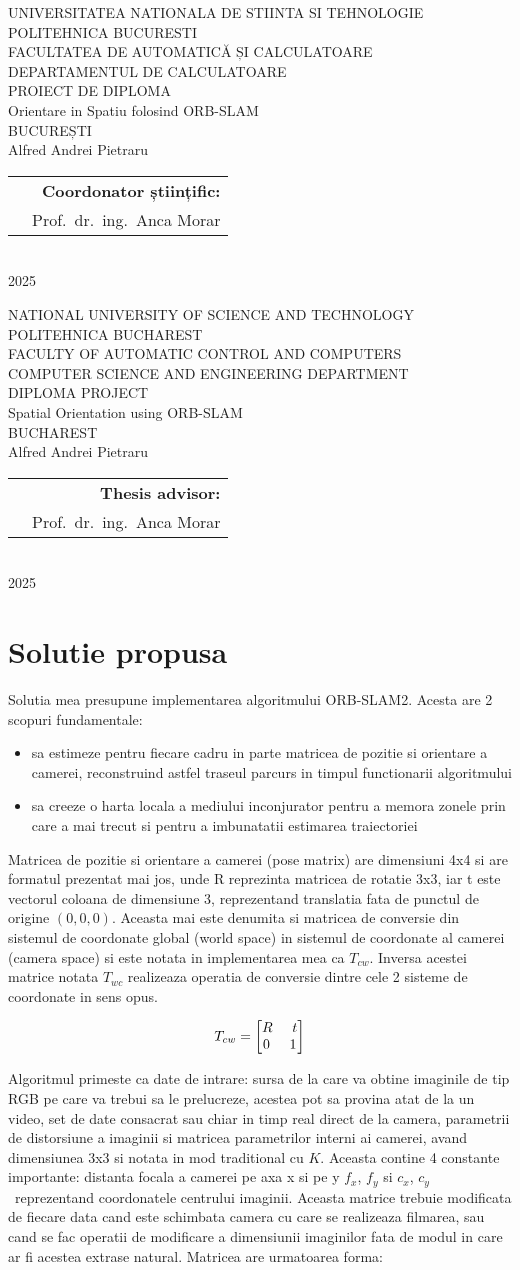 \documentclass[12pt,a4paper]{report}
\makeatletter
\newcommand{\HeaderLineSpace}{-0.25cm}
\newcommand{\UniTextRO}{UNIVERSITATEA NATIONALA DE STIINTA SI TEHNOLOGIE POLITEHNICA BUCURESTI \\[\HeaderLineSpace] 
FACULTATEA DE AUTOMATICĂ ȘI CALCULATOARE \\[\HeaderLineSpace]
DEPARTAMENTUL DE CALCULATOARE\\}
\newcommand{\DiplomaRO}{PROIECT DE DIPLOMA}
\newcommand{\AdvisorRO}{Coordonator științific:}
\newcommand{\BucRO}{BUCUREȘTI}
\newcommand{\UniTextEN}{NATIONAL UNIVERSITY OF SCIENCE AND TECHNOLOGY POLITEHNICA BUCHAREST \\[\HeaderLineSpace]
FACULTY OF AUTOMATIC CONTROL AND COMPUTERS \\[\HeaderLineSpace]
COMPUTER SCIENCE AND ENGINEERING DEPARTMENT\\}
\newcommand{\DiplomaEN}{DIPLOMA PROJECT}
\newcommand{\AdvisorEN}{Thesis advisor:}
\newcommand{\BucEN}{BUCHAREST}
\newcommand{\ProjectTitleRO}{Orientare in Spatiu folosind ORB-SLAM}
\newcommand{\ProjectTitleEN}{Spatial Orientation using ORB-SLAM}
\newcommand{\frontPage}[6]{
\begin{titlepage}
\begin{center}
{\Large #1}  %
\vspace{50pt}
\vspace{105pt}
{\Huge #2}\\                           %
\vspace{40pt}
{\Large #3}\\ \vspace{0pt}  %
{\Large #4}\\                          %
\vspace{40pt}
{\LARGE Alfred Andrei Pietraru}\\                   %
\end{center}
\vspace{60pt}
\begin{tabular*}{\textwidth}{@{\extracolsep{\fill}}p{6cm}r}
&{\large\textbf{#5}}\vspace{10pt}\\      %
&{\large Prof.\ dr.\ ing.\ Anca Morar}                                    %
\end{tabular*}
\vspace{20pt}
\begin{center}
{\large\textbf{#6}}\\                                %
\vspace{0pt}
{\normalsize 2025}
\end{center}
\end{titlepage}
}
\newcommand{\frontPageRO}{\frontPage{\UniTextRO}{\DiplomaRO}{\ProjectTitleRO}{\BucRO}{\AdvisorRO}}
\newcommand{\frontPageEN}{\frontPage{\UniTextEN}{\DiplomaEN}{\ProjectTitleEN}{\BucEN}{\AdvisorEN}}
\makeatother
\begin{document}
\frontPageRO{}
\frontPageEN{}
\AbstractPage{}
\chapter{Solutie propusa}
Solutia mea presupune implementarea algoritmului ORB-SLAM2. Acesta are 2 scopuri 
fundamentale:
\begin{itemize}
    \item sa estimeze pentru fiecare cadru in parte matricea de pozitie si orientare
a camerei, reconstruind astfel traseul parcurs in timpul functionarii algoritmului  
    \item sa creeze o harta locala a mediului inconjurator pentru a memora zonele
prin care a mai trecut si pentru a imbunatatii estimarea traiectoriei  
\end{itemize}
Matricea de pozitie si orientare a camerei (pose matrix) are dimensiuni 4x4 si are 
formatul prezentat mai jos, unde R reprezinta matricea de rotatie 3x3, iar t este
vectorul coloana de dimensiune 3, reprezentand translatia fata de punctul de origine
\( (0, 0, 0)\). Aceasta mai este denumita si matricea de conversie din sistemul de 
coordonate global (world space) in sistemul de coordonate al camerei (camera space) si 
este notata in implementarea mea ca \( T_{cw} \). Inversa acestei matrice notata
\(T_{wc} \) realizeaza operatia de conversie dintre cele 2 sisteme de coordonate 
in sens opus.

\begin{equation}
T_{cw} = 
\begin{bmatrix}
R \hspace{0.5cm} t \\
0 \hspace{0.5cm} 1
\end{bmatrix}
\end{equation}

Algoritmul primeste ca date de intrare: sursa de la care va obtine imaginile de tip
RGB pe care va trebui sa le prelucreze, acestea pot sa provina atat de la un video,
set de date consacrat sau chiar in timp real direct de la camera, parametrii de 
distorsiune a imaginii si matricea parametrilor interni ai camerei, avand dimensiunea 
3x3 si notata in mod traditional cu \(K\). Aceasta contine 4 constante importante: 
distanta focala a camerei pe axa x si pe y \(f_x\), \(f_y\) si \(c_x\), \(c_y\) \
reprezentand coordonatele centrului imaginii. Aceasta matrice trebuie modificata de 
fiecare data cand este schimbata camera cu care se realizeaza filmarea, sau cand se 
fac operatii de modificare a dimensiunii imaginilor fata de modul in care ar fi 
acestea extrase natural. Matricea are urmatoarea forma:
   
\end{document}
